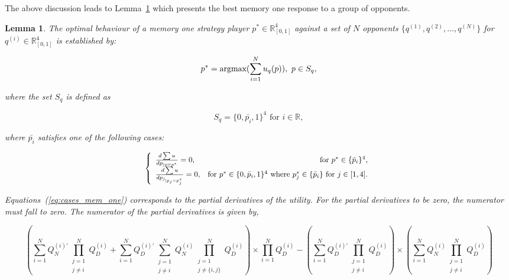 \documentclass[10pt]{article}
\newcommand{\R}{\mathbb{R}}
\newtheorem{lemma}[theorem]{Lemma}
\begin{document}
The above discussion leads to Lemma~\ref{lemma:memone_group_best_response} which
presents the best memory one response to a group of opponents.

\begin{lemma}\label{lemma:memone_group_best_response}
    The optimal behaviour of a memory one strategy player \(p^* \in \R_{[0, 1]} ^ 4\)
    against a set of \(N\) opponents \(\{q^{(1)}, q^{(2)}, \dots, q^{(N)} \}\)
    for \(q^{(i)} \in \R_{[0, 1]} ^ 4\) is established by:

    \[p^* = \textnormal{argmax}(\sum\limits_{i=1} ^ N  u_q(p)), \ p \in S_q,\]

    where the set \(S_q\) is defined as

    \[S_q = \{0, \bar{p_i}, 1 \}^4 \text{ for } i \in \R,\]

    where \(\bar{p_i}\) satisfies one of the following cases:

    \begin{equation}\label{eq:cases_mem_one}\resizebox{.8\hsize}{!}{$
        \left\{\begin{array}{lr}
        \frac{d\sum u}{dp_{|p=p^*}} = 0, & \text{for } p^* \in \{\bar{p}_i\} ^ 4, \\
        \frac{d\sum u}{dp_{j_{|p_j=p_j^*}}} = 0, & \text{for } p^* \in \{0, \bar{p}_i, 1\} ^ 4
        \text{ where } p_j ^ * \in \{\bar{p}_i\} \text{ for } j \in [1, 4].\\
        \end{array}\right.$}
    \end{equation}

    Equations~(\ref{eq:cases_mem_one}) corresponds to the partial derivatives of the
    utility. For the partial derivatives to be zero, the numerator must fall
    to zero. The numerator of the partial derivatives is given by,

    \begin{equation}\label{eq:group_derivative_numerator_condition}
    (\sum\limits_{i=1} ^ {N} Q_{N}^{(i)'} \prod_{\substack{j=1 \\ j \neq i}} ^ N Q_{D}^{(i)}
     + \sum\limits_{i=1} ^ {N} Q_{D}^{(i)'} \sum_{\substack{j=1 \\ j \neq i}} ^ {N} Q_{N}^{(i)}
    \prod_{\substack{j=1 \\ j \neq \{i, j\}}} ^ N Q_{D}^{(i)}) \times
    \prod\limits_{i=1} ^ N Q_{D}^{(i)} - (\sum\limits_{i=1} ^ {N} Q_{D}^{(i)'}
    \prod_{\substack{j=1 \\ j \neq i}} ^ N Q_{D}^{(i)}) \times
    (\sum\limits_{i=1} ^ {N} Q_{N}^{(i)} \prod_{\substack{j=1 \\ j \neq i}} ^ N Q_{D}^{(i)})
    \end{equation}


\end{lemma}
\end{document}
